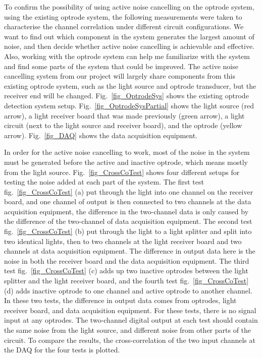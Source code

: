 To confirm the possibility of using active noise cancelling on the optrode system, using the existing optrode system, the following measurements were taken to characterise the channel correlation under different circuit configurations.  We want to find out which component in the system generates the largest amount of noise, and then decide whether active noise cancelling is achievable and effective.  Also, working with the optrode system can help me familiarize with the system and find some parts of the system that could be improved.  The active noise cancelling system from our project will largely share components from this existing optrode system, such as the light source and optrode transducer, but the receiver end will be changed.  Fig.~\ref{fig_OptrodeSys} shows the existing optrode detection system setup.  Fig.~\ref{fig_OptrodeSysPartial} shows the light source (red arrow), a light receiver board that was made previously (green arrow), a light circuit (next to the light source and receiver board), and the optrode (yellow arrow).  Fig.~\ref{fig_DAQ} shows the data acquisition equipment.

In order for the active noise cancelling to work, most of the noise in the system must be generated before the active and inactive optrode, which means mostly from the light source.  Fig.~\ref{fig_CrossCoTest} shows four different setups for testing the noise added at each part of the system.  The first test fig.~\ref{fig_CrossCoTest} (a) put through the light into one channel on the receiver board, and one channel of output is then connected to two channels at the data acquisition equipment, the difference in the two-channel data is only caused by the difference of the two-channel of data acquisition equipment.  The second test fig.~\ref{fig_CrossCoTest} (b) put through the light to a light splitter and split into two identical lights, then to two channels at the light receiver board and two channels at data acquisition equipment.  The difference in output data here is the noise in both the receiver board and the data acquisition equipment.  The third test fig.~\ref{fig_CrossCoTest} (c) adds up two inactive optrodes between the light splitter and the light receiver board, and the fourth test fig.~\ref{fig_CrossCoTest} (d) adds inactive optrode to one channel and active optrode to another channel.  In these two tests, the difference in output data comes from optrodes, light receiver board, and data acquisition equipment.  For these tests, there is no signal input at any optrodes.  The two-channel digital output at each test should contain the same noise from the light source, and different noise from other parts of the circuit.  To compare the results, the cross-correlation of the two input channels at the DAQ for the four tests is plotted.

